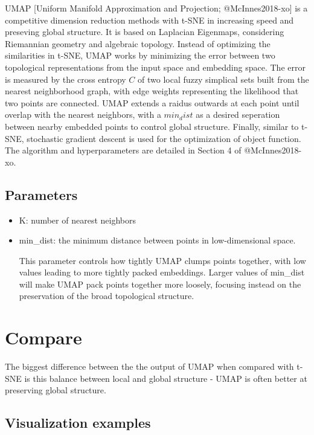 \documentclass[
]{article}
\begin{document}
UMAP {[}Uniform Manifold Approximation and Projection; @McInnes2018-xo{]} is a competitive dimension reduction methods with t-SNE in increasing speed and preseving global structure. It is based on Laplacian Eigenmaps, considering Riemannian geometry and algebraic topology. Instead of optimizing the similarities in t-SNE, UMAP works by minimizing the error between two topological representations from the input space and embedding space. The error is measured by the cross entropy \(C\) of two local fuzzy simplical sets built from the nearest neighborhood graph, with edge weights representing the likelihood that two points are connected.
UMAP extends a raidus outwards at each point until overlap with the nearest neighbors, with a \(min_dist\) as a desired seperation between nearby embedded points to control global structure. Finally, similar to t-SNE, stochastic gradient descent is used for the optimization of object function. The algorithm and hyperparameters are detailed in Section 4 of @McInnes2018-xo.

\hypertarget{parameters}{%
\subsection{Parameters}\label{parameters}}

\begin{itemize}
\item
  K: number of nearest neighbors
\item
  min\_dist: the minimum distance between points in low-dimensional space.

  This parameter controls how tightly UMAP clumps points together, with low values leading to more tightly packed embeddings. Larger values of min\_dist will make UMAP pack points together more loosely, focusing instead on the preservation of the broad topological structure.
\end{itemize}

\hypertarget{compare}{%
\section{Compare}\label{compare}}

The biggest difference between the the output of UMAP when compared with t-SNE is this balance between local and global structure - UMAP is often better at preserving global structure.

\hypertarget{visualization-examples}{%
\subsection{Visualization examples}\label{visualization-examples}}
\end{document}
